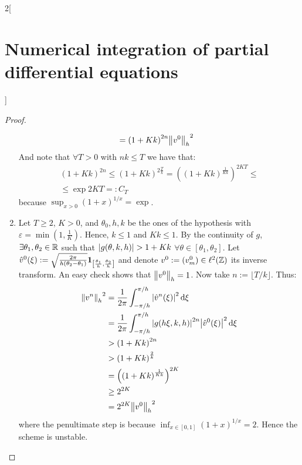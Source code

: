 \documentclass[../../../main_math.tex]{subfiles}
\begin{document}
\begin{multicols}{2}[\section{Numerical integration of partial differential equations}]
\begin{proof}
\begin{enumerate}
\begin{align*}
                                 & ={(1+Kk)}^{2n} {\left\|{v}^0\right\|_h}^2
            \end{align*}
            And note that $\forall T>0$ with $nk\leq T$ we have that:
            \begin{multline*}
              {(1+Kk)}^{2n}\leq{(1+Kk)}^{2\frac{T}{k}}={\left({(1+Kk)}^\frac{1}{Kk}\right)}^{2 K T}\leq\\\leq \exp{2K T}=:C_T
            \end{multline*}
            because $\sup_{x>0}{(1+x)}^{1/x}=\exp{}$.
      \item Let $T\geq 2$, $K>0$, and $\theta_0,h,k$ be the ones of the hypothesis with $\varepsilon=\min(1,\frac{1}{K})$. Hence, $k\leq 1$ and $Kk\leq 1$. By the continuity of $g$, $\exists \theta_1,\theta_2\in\mathbb{R}$ such that $\abs{g(\theta, k,h)}>1+Kk$ $\forall\theta\in[\theta_1,\theta_2]$. Let $\hat{v}^0(\xi):=\sqrt{\frac{2\pi}{h(\theta_2-\theta_1)}}\boldsymbol{\mathrm{1}}_{\left[\frac{\theta_1}{h},\frac{\theta_2}{h}\right]}$ and denote $v^0:=(v_m^0)\in\ell^2(\mathbb{Z})$ its inverse transform. An easy check shows that $\left\|v^0\right\|_h=1$. Now take $n:=\lfloor T/k \rfloor$. Thus:
            \begin{align*}
              {\left\|v^n\right\|_h}^2 & =\frac{1}{2\pi}\int_{-\pi/h}^{\pi/h} \abs{\hat{v}^n(\xi)}^2\dd{\xi}                        \\
                               & =\frac{1}{2\pi}\int_{-\pi/h}^{\pi/h} \abs{g(h\xi, k,h)}^{2n}\abs{\hat{v}^0(\xi)}^2\dd{\xi} \\
                               & >{(1+Kk)}^{2n}                                                                             \\
                               & >{(1+Kk)}^{\frac{2}{k}}                                                                    \\
                               & ={\left({(1+Kk)}^{\frac{1}{Kk}}\right)}^{2K}                                               \\
                               & \geq 2^{2K}                                                                                \\
                               & =2^{2K}{\left\|v^0\right\|_h}^2
            \end{align*}
            where the penultimate step is because $\inf_{x\in[0,1]}{(1+x)}^{1/x}=2$.
            Hence the scheme is unstable.
    \end{enumerate}
  \end{proof}
  \begin{corollary}

\end{corollary}
\end{multicols}
\end{document}
